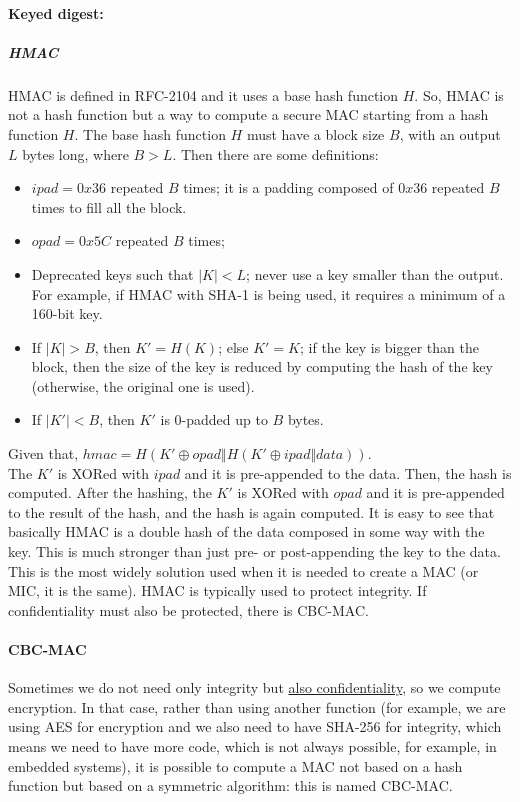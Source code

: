 \paragraph*{Keyed digest:}

\subparagraph*{HMAC}
HMAC is defined in RFC-2104 and it uses a base hash function \(H\). So, HMAC is not a hash function but a way to compute a secure MAC starting from a hash function \(H\). The base hash function \(H\) must have a block size \(B\), with an output \(L\) bytes long, where \(B > L\). Then there are some definitions:
\begin{itemize}
    \item \(ipad = 0x36\) repeated \(B\) times; it is a padding composed of \(0x36\) repeated \(B\) times to fill all the block.
    \item \(opad = 0x5C\) repeated \(B\) times;
    \item Deprecated keys such that \(|K| < L\); never use a key smaller than the output. For example, if HMAC with SHA-1 is being used, it requires a minimum of a 160-bit key.
    \item If \(|K| > B\), then \(K' = H(K)\); else \(K' = K\); if the key is bigger than the block, then the size of the key is reduced by computing the hash of the key (otherwise, the original one is used).
    \item If \(|K'| < B\), then \(K'\) is 0-padded up to \(B\) bytes.
\end{itemize}

Given that, \(hmac = H(K' \oplus opad \Vert H(K' \oplus ipad \Vert data))\).\\
The \(K'\) is XORed with \(ipad\) and it is pre-appended to the data. Then, the hash is computed. After the hashing, the \(K'\) is XORed with \(opad\) and it is pre-appended to the result of the hash, and the hash is again computed. It is easy to see that basically HMAC is a double hash of the data composed in some way with the key. This is much stronger than just pre- or post-appending the key to the data. This is the most widely solution used when it is needed to create a MAC (or MIC, it is the same). HMAC is typically used to protect integrity. If confidentiality must also be protected, there is CBC-MAC.


\paragraph*{CBC-MAC}
Sometimes we do not need only integrity but \underline{also confidentiality}, so we compute encryption. In that case, rather than using another function (for example, we are using AES for encryption and we also need to have SHA-256 for integrity, which means we need to have more code, which is not always possible, for example, in embedded systems), it is possible to compute a MAC not based on a hash function but based on a symmetric algorithm: this is named CBC-MAC.

